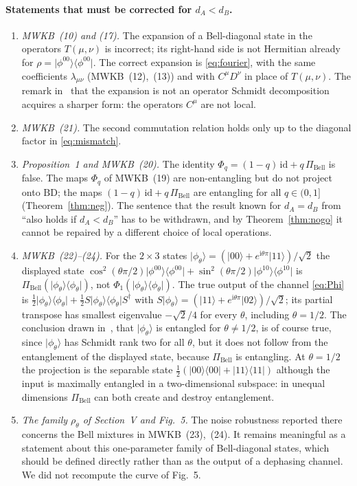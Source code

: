 \documentclass[11pt,a4paper]{article}
\theoremstyle{definition}
\theoremstyle{remark}
\newcommand{\ket}[1]{\lvert #1\rangle}
\newcommand{\ketbra}[2]{\lvert #1\rangle\langle #2\rvert}
\newcommand{\dA}{d_A}
\newcommand{\dB}{d_B}
\newcommand{\PiB}{\Pi_{\mathrm{Bell}}}
\newcommand{\BD}{\mathrm{BD}}
\newcommand{\phib}[2]{\phi^{#1#2}}
\begin{document}
\paragraph{Statements that must be corrected for $\dA<\dB$.}
\begin{enumerate}
\item \emph{MWKB~(10) and (17).} The expansion of a Bell-diagonal state in the operators
$T(\mu,\nu)$ is incorrect; its right-hand side is not Hermitian already for
$\rho=\ketbra{\phib00}{\phib00}$. The correct expansion is \eqref{eq:fourier}, with the same
coefficients $\lambda_{\mu\nu}$ (MWKB~(12),~(13)) and with $C^{\mu}D^{\nu}$ in place of
$T(\mu,\nu)$. The remark in~\cite{MWKB24} that the expansion is not an operator Schmidt
decomposition acquires a sharper form: the operators $C^{\mu}$ are not local.
\item \emph{MWKB~(21).} The second commutation relation holds only up to the diagonal
factor in \eqref{eq:mismatch}.
\item \emph{Proposition~1 and MWKB~(20).} The identity $\Phi_q=(1-q)\,\mathrm{id}+q\,\PiB$
is false. The maps $\Phi_q$ of MWKB~(19) are non-entangling but do not project onto
$\BD$; the maps $(1-q)\,\mathrm{id}+q\,\PiB$ are entangling for all $q\in(0,1]$
(Theorem~\ref{thm:neg}). The sentence that the result known for $\dA=\dB$ from~\cite{PH24}
``also holds if $\dA<\dB$'' has to be withdrawn, and by Theorem~\ref{thm:nogo} it cannot
be repaired by a different choice of local operations.
\item \emph{MWKB~(22)--(24).} For the $2\times3$ states
$\ket{\phi_\theta}=(\ket{00}+e^{\mathrm{i}\theta\pi}\ket{11})/\sqrt2$ the displayed state
$\cos^{2}(\theta\pi/2)\ketbra{\phib00}{\phib00}+\sin^{2}(\theta\pi/2)\ketbra{\phib10}{\phib10}$
is $\PiB(\ketbra{\phi_\theta}{\phi_\theta})$, not
$\Phi_1(\ketbra{\phi_\theta}{\phi_\theta})$. The true output of the channel \eqref{eq:Phi}
is $\tfrac12\ketbra{\phi_\theta}{\phi_\theta}+\tfrac12S\ketbra{\phi_\theta}{\phi_\theta}S^{\dagger}$
with $S\ket{\phi_\theta}=(\ket{11}+e^{\mathrm{i}\theta\pi}\ket{02})/\sqrt2$; its partial
transpose has smallest eigenvalue $-\sqrt2/4$ for every $\theta$, including
$\theta=1/2$. The conclusion drawn in~\cite{MWKB24}, that $\ket{\phi_\theta}$ is entangled
for $\theta\neq1/2$, is of course true, since $\ket{\phi_\theta}$ has Schmidt rank two for
all $\theta$, but it does not follow from the entanglement of the displayed state, because
$\PiB$ is entangling. At $\theta=1/2$ the projection is the separable state
$\tfrac12(\ketbra{00}{00}+\ketbra{11}{11})$ although the input is maximally entangled in a
two-dimensional subspace: in unequal dimensions $\PiB$ can both create and destroy
entanglement.
\item \emph{The family $\rho_\theta$ of Section~V and Fig.~5.} The noise robustness
reported there concerns the Bell mixtures in MWKB~(23),~(24). It remains meaningful as a
statement about this one-parameter family of Bell-diagonal states, which should be
defined directly rather than as the output of a dephasing channel. We did not recompute
the curve of Fig.~5.
\end{enumerate}
\end{document}

